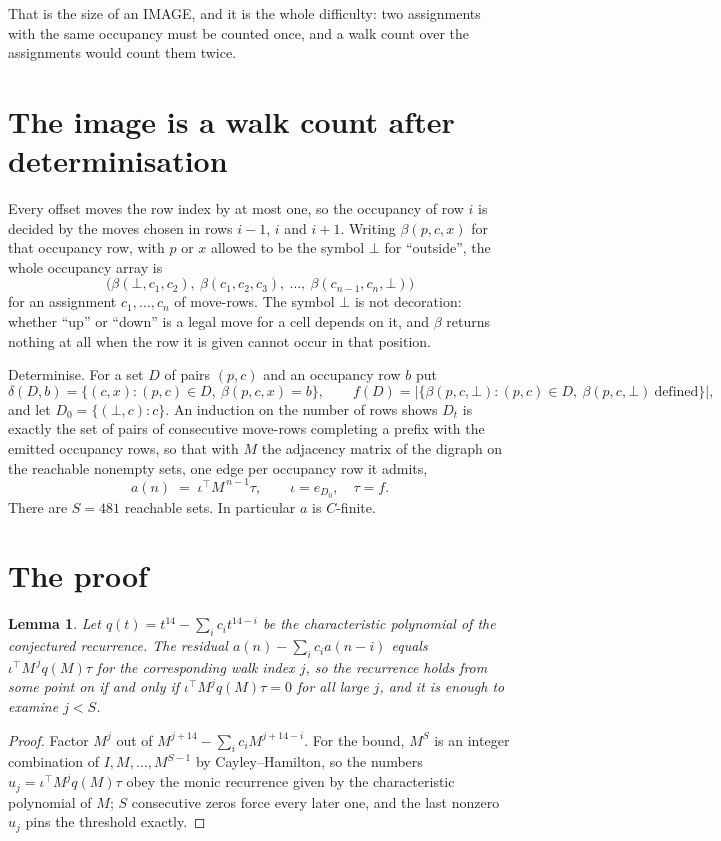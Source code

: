 \documentclass[11pt,a4paper]{article}
\theoremstyle{plain}
\newtheorem{lemma}[theorem]{Lemma}
\theoremstyle{definition}
\begin{document}
That is the size of an IMAGE, and it is the whole difficulty: two assignments with the same
occupancy must be counted once, and a walk count over the assignments would count them twice.

\section{The image is a walk count after determinisation}

Every offset moves the row index by at most one, so the occupancy of row $i$ is decided by the
moves chosen in rows $i-1$, $i$ and $i+1$. Writing $\beta(p,c,x)$ for that occupancy row, with
$p$ or $x$ allowed to be the symbol $\bot$ for ``outside'', the whole occupancy array is
\[
\bigl(\beta(\bot,c_1,c_2),\ \beta(c_1,c_2,c_3),\ \dots,\ \beta(c_{n-1},c_n,\bot)\bigr)
\]
for an assignment $c_1,\dots,c_n$ of move-rows. The symbol $\bot$ is not decoration: whether
``up'' or ``down'' is a legal move for a cell depends on it, and $\beta$ returns nothing at all
when the row it is given cannot occur in that position.

Determinise. For a set $D$ of pairs $(p,c)$ and an occupancy row $b$ put
\[
\delta(D,b)=\{(c,x):(p,c)\in D,\ \beta(p,c,x)=b\},\qquad
f(D)=\bigl|\{\beta(p,c,\bot):(p,c)\in D,\ \beta(p,c,\bot)\ \text{defined}\}\bigr| ,
\]
and let $D_0=\{(\bot,c):c\}$. An induction on the number of rows shows $D_t$ is exactly the
set of pairs of consecutive move-rows completing a prefix with the emitted occupancy rows, so
that with $M$ the adjacency matrix of the digraph on the reachable nonempty sets, one edge per
occupancy row it admits,
\[
a(n)\;=\;\iota^{\!\top}M^{\,n-1}\tau,\qquad \iota=e_{D_0},\quad \tau=f .
\]
There are $S=481$ reachable sets. In particular $a$ is $C$-finite.

\section{The proof}

\begin{lemma}\label{lem:crit}
Let $q(t)=t^{14}-\sum_i c_it^{14-i}$ be the characteristic polynomial of the
conjectured recurrence. The residual $a(n)-\sum_ic_ia(n-i)$ equals
$\iota^{\!\top}M^{\,j}q(M)\tau$ for the corresponding walk index $j$, so the recurrence
holds from some point on if and only if $\iota^{\!\top}M^{j}q(M)\tau=0$ for all large $j$,
and it is enough to examine $j<S$.
\end{lemma}

\begin{proof}
Factor $M^{j}$ out of $M^{j+14}-\sum_ic_iM^{j+14-i}$. For the bound, $M^{S}$
is an integer combination of $I,M,\dots,M^{S-1}$ by Cayley--Hamilton, so the numbers
$u_j=\iota^{\!\top}M^{j}q(M)\tau$ obey the monic recurrence given by the characteristic
polynomial of $M$; $S$ consecutive zeros force every later one, and the last nonzero $u_j$
pins the threshold exactly.
\end{proof}
\end{document}
